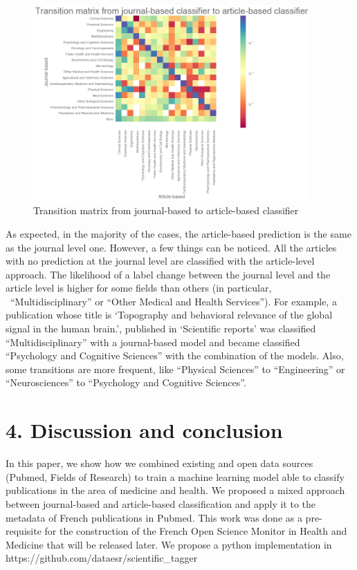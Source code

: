 \documentclass[
]{article}
\begin{document}
\begin{figure}
\centering
\includegraphics[width=4.16667in,height=\textheight]{transition_matrix.png}
\caption{Transition matrix from journal-based to article-based
classifier}
\end{figure}

As expected, in the majority of the cases, the article-based prediction
is the same as the journal level one. However, a few things can be
noticed. All the articles with no prediction at the journal level are
classified with the article-level approach. The likelihood of a label
change between the journal level and the article level is higher for
some fields than others (in particular, ~``Multidisciplinary'' or
``Other Medical and Health Services''). For example, a publication whose
title is `Topography and behavioral relevance of the global signal in
the human brain.', published in `Scientific reports' was classified
``Multidisciplinary'' with a journal-based model and became classified
``Psychology and Cognitive Sciences'' with the combination of the
models. Also, some transitions are more frequent, like ``Physical
Sciences'' to ``Engineering'' or ``Neurosciences'' to ``Psychology and
Cognitive Sciences''.

\hypertarget{discussion-and-conclusion}{%
\section{4. Discussion and conclusion}\label{discussion-and-conclusion}}

In this paper, we show how we combined existing and open data sources
(Pubmed, Fields of Research) to train a machine learning model able to
classify publications in the area of medicine and health. We proposed a
mixed approach between journal-based and article-based classification
and apply it to the metadata of French publications in Pubmed. This work
was done as a pre-requisite for the construction of the French Open
Science Monitor in Health and Medicine that will be released later. We
propose a python implementation in
https://github.com/dataesr/scientific\_tagger
\end{document}
